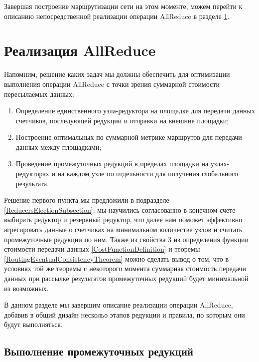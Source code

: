 \documentclass{article}
\theoremstyle{plain}
\theoremstyle{plain}
\theoremstyle{plain}
\theoremstyle{plain}
\theoremstyle{definition}
\theoremstyle{remark}
\theoremstyle{plain}
\begin{document}
Завершая построение маршрутизации сети на этом моменте, можем перейти к описанию непосредственной реализации операции AllReduce в разделе \ref{AllReduceSection}.

\section{Реализация AllReduce}
\label{AllReduceSection}

Напомним, решение каких задач мы должны обеспечить для оптимизации выполнения операции AllReduce с точки зрения суммарной стоимости пересылаемых данных:

\begin{enumerate}
    \item Определение единственного узла-редуктора на площадке для передачи данных счетчиков, последующей редукции и отправки на внешние площадки;
    
    \item Построение оптимальных по суммарной метрике маршрутов для передачи данных между площадками;
    
    \item Проведение промежуточных редукций в пределах площадки на узлах-редукторах и на каждом узле по отдельности для получения глобального результата.
\end{enumerate}

Решение первого пункта мы предложили в подразделе \ref{ReducersElectionSubsection}: мы научились согласованно в конечном счете выбирать редуктор и резервный редуктор, что далее нам поможет эффективно агрегировать данные о счетчиках на минимальном количестве узлов и считать промежуточные редукции по ним. Также из свойства 3 из определения функции стоимости передачи данных \ref{CostFunctionDefinition} и теоремы \ref{RoutingEventualConsistencyTheorem} можно сделать вывод о том, что в условиях той же теоремы с некоторого момента суммарная стоимость передачи данных при рассылке результатов промежуточных редукций будет минимальной из возможных.

В данном разделе мы завершим описание реализации операции AllReduce, добавив в общий дизайн нескольо этапов редукции и правила, по которым они будут выполняться.

\subsection{Выполнение промежуточных редукций}
\label{ReductionImplementationSubsection}
\end{document}
